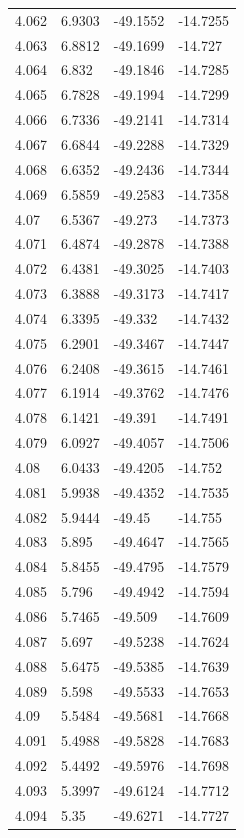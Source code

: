 \begin{tabular}{llll}
4.062 & 6.9303 & -49.1552 & -14.7255 \\
4.063 & 6.8812 & -49.1699 & -14.727 \\
4.064 & 6.832 & -49.1846 & -14.7285 \\
4.065 & 6.7828 & -49.1994 & -14.7299 \\
4.066 & 6.7336 & -49.2141 & -14.7314 \\
4.067 & 6.6844 & -49.2288 & -14.7329 \\
4.068 & 6.6352 & -49.2436 & -14.7344 \\
4.069 & 6.5859 & -49.2583 & -14.7358 \\
4.07 & 6.5367 & -49.273 & -14.7373 \\
4.071 & 6.4874 & -49.2878 & -14.7388 \\
4.072 & 6.4381 & -49.3025 & -14.7403 \\
4.073 & 6.3888 & -49.3173 & -14.7417 \\
4.074 & 6.3395 & -49.332 & -14.7432 \\
4.075 & 6.2901 & -49.3467 & -14.7447 \\
4.076 & 6.2408 & -49.3615 & -14.7461 \\
4.077 & 6.1914 & -49.3762 & -14.7476 \\
4.078 & 6.1421 & -49.391 & -14.7491 \\
4.079 & 6.0927 & -49.4057 & -14.7506 \\
4.08 & 6.0433 & -49.4205 & -14.752 \\
4.081 & 5.9938 & -49.4352 & -14.7535 \\
4.082 & 5.9444 & -49.45 & -14.755 \\
4.083 & 5.895 & -49.4647 & -14.7565 \\
4.084 & 5.8455 & -49.4795 & -14.7579 \\
4.085 & 5.796 & -49.4942 & -14.7594 \\
4.086 & 5.7465 & -49.509 & -14.7609 \\
4.087 & 5.697 & -49.5238 & -14.7624 \\
4.088 & 5.6475 & -49.5385 & -14.7639 \\
4.089 & 5.598 & -49.5533 & -14.7653 \\
4.09 & 5.5484 & -49.5681 & -14.7668 \\
4.091 & 5.4988 & -49.5828 & -14.7683 \\
4.092 & 5.4492 & -49.5976 & -14.7698 \\
4.093 & 5.3997 & -49.6124 & -14.7712 \\
4.094 & 5.35 & -49.6271 & -14.7727 \\

\end{tabular}

